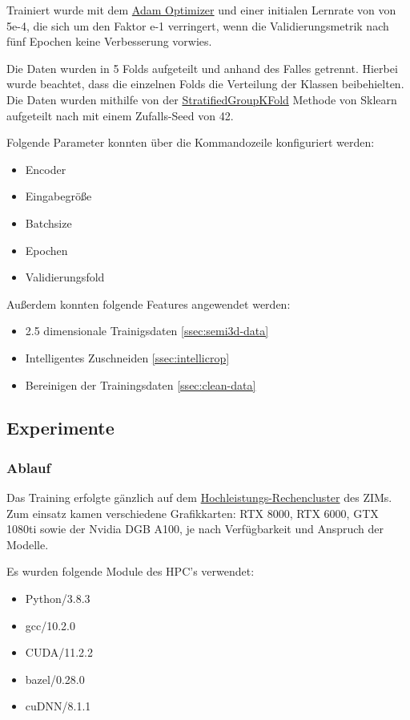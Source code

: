  Trainiert wurde mit dem
\href{https://optimization.cbe.cornell.edu/index.php?title=Adam}{Adam Optimizer}
 und einer initialen Lernrate von von 5e-4, die sich um den Faktor e-1 verringert, wenn die Validierungsmetrik nach fünf Epochen keine Verbesserung vorwies.

Die Daten wurden in 5 Folds aufgeteilt und anhand des Falles getrennt. Hierbei wurde beachtet, dass die einzelnen Folds die Verteilung der Klassen beibehielten.
Die Daten wurden mithilfe von der 
\href{https://scikit-learn.org/stable/modules/generated/sklearn.model_selection.StratifiedGroupKFold.html}{StratifiedGroupKFold} Methode von Sklearn aufgeteilt nach mit einem  Zufalls-Seed von 42.

Folgende Parameter konnten über die Kommandozeile konfiguriert werden:
\begin{itemize}
\item Encoder
\item Eingabegröße
\item Batchsize
\item Epochen
\item Validierungsfold
\end{itemize}

Außerdem konnten folgende Features angewendet werden:
\begin{itemize}
\item 2.5 dimensionale Trainigsdaten \ref{ssec:semi3d-data}
\item Intelligentes Zuschneiden \ref{ssec:intellicrop}
\item Bereinigen der Trainingsdaten \ref{ssec:clean-data}
\end{itemize}

\subsection{Experimente}

\subsubsection{Ablauf}

Das Training erfolgte gänzlich auf dem \href{https://wiki.hhu.de/display/HPC/Abschlussarbeiten+im+HPC}{Hochleistungs-Rechencluster} des ZIMs. Zum einsatz kamen verschiedene Grafikkarten: RTX 8000, RTX 6000, GTX 1080ti sowie der Nvidia DGB A100, je nach Verfügbarkeit und Anspruch der Modelle. 

Es wurden folgende Module des HPC's verwendet: 
\begin{itemize}
\item Python/3.8.3
\item gcc/10.2.0
\item CUDA/11.2.2
\item bazel/0.28.0
\item cuDNN/8.1.1
\end{itemize}

